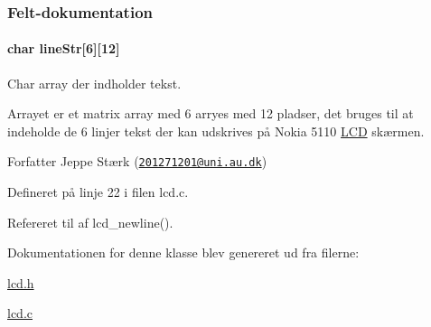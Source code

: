 \subsubsection{Felt-\/dokumentation}
\paragraph[{\texorpdfstring{line\+Str}{lineStr}}]{\setlength{\rightskip}{0pt plus 5cm}char line\+Str\mbox{[}6\mbox{]}\mbox{[}12\mbox{]}\hspace{0.3cm}{\ttfamily [private]}}\hypertarget{class_l_c_d_a51a220275e6d21942189276ef7d9e7c3}{}\label{class_l_c_d_a51a220275e6d21942189276ef7d9e7c3}


Char array der indholder tekst. 

Arrayet er et matrix array med 6 arryes med 12 pladser, det bruges til at indeholde de 6 linjer tekst der kan udskrives på Nokia 5110 \hyperlink{class_l_c_d}{L\+CD} skærmen.

\begin{DoxyAuthor}{Forfatter}
Jeppe Stærk (\href{mailto:201271201@uni.au.dk}{\tt 201271201@uni.\+au.\+dk}) 
\end{DoxyAuthor}


Defineret på linje 22 i filen lcd.\+c.



Refereret til af lcd\+\_\+newline().



Dokumentationen for denne klasse blev genereret ud fra filerne\+:\begin{DoxyCompactItemize}
\item 
\hyperlink{lcd_8h}{lcd.\+h}\item 
\hyperlink{lcd_8c}{lcd.\+c}\end{DoxyCompactItemize}
